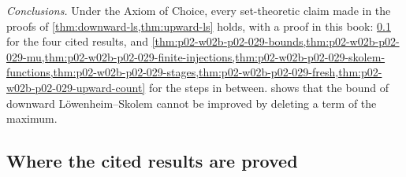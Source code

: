 \emph{Conclusions.} Under the Axiom of Choice, every set-theoretic claim made
in the proofs of \cref{thm:downward-ls,thm:upward-ls} holds, with a proof in
this book: \cref{sec:p02-w02b-p02-029-where} for the four cited results, and
\cref{thm:p02-w02b-p02-029-bounds,thm:p02-w02b-p02-029-mu,thm:p02-w02b-p02-029-finite-injections,thm:p02-w02b-p02-029-skolem-functions,thm:p02-w02b-p02-029-stages,thm:p02-w02b-p02-029-fresh,thm:p02-w02b-p02-029-upward-count}
for the steps in between.  shows that
the bound of downward L\"owenheim--Skolem cannot be improved by deleting a
term of the maximum.

\subsection{Where the cited results are proved}
\label{sec:p02-w02b-p02-029-where}

